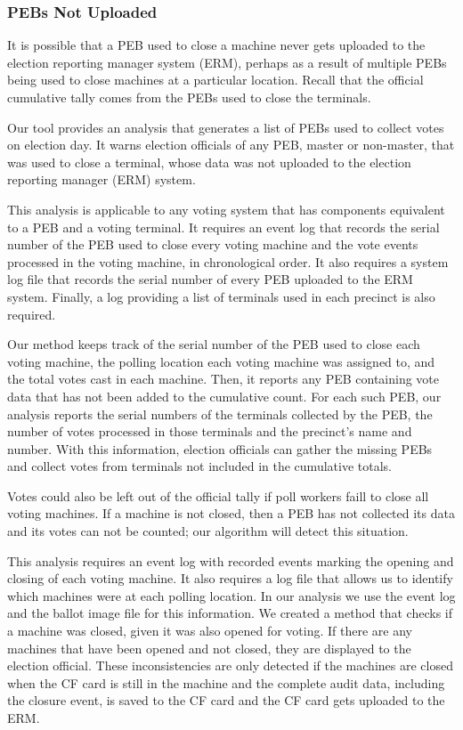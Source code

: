 \subsubsection{PEBs Not Uploaded}
\label{sec:pebs_not_uploaded}
It is possible that a PEB used to close a machine never gets uploaded to the
election reporting manager system (ERM), perhaps as a result of multiple PEBs
being used to close machines at a particular location. Recall that the official
cumulative tally comes from the PEBs used to close the terminals.

Our
tool provides an analysis that generates a list of PEBs used to collect
votes on election day. It warns election officials of any PEB, master
or non-master, that was used to close a terminal, whose data was not
uploaded to the election reporting manager (ERM) system.  

This analysis is applicable to any voting system that has components
equivalent to a PEB and a voting terminal.  It requires an event log
that records the serial number of the PEB used to close every voting
machine and the vote events processed in the voting machine, in
chronological order. It also requires a system log file that records the
serial number of every PEB uploaded to the ERM 
system. Finally, a log providing a list of terminals used in each
precinct is also required.

Our method keeps track of the serial number of the PEB used to close each voting
machine, the polling location each voting machine was assigned
to, and the total votes cast in each machine. Then, it
reports any PEB containing vote data that has not been added to the cumulative
count.  For each such PEB, our analysis reports the serial numbers of the
terminals collected by the PEB, the number of votes processed in those terminals
and the precinct's name and number. With this information, election officials
can gather the missing PEBs and collect votes from terminals not included in the
cumulative totals.

Votes could also be left out of the official tally if poll workers faill to close
all voting machines. If a machine is not closed, then a PEB has
not collected its data and its votes can not be counted; our algorithm
will  detect this situation.   

This analysis requires an event log with recorded events marking the
opening and closing of each voting machine. It also requires a log
file that allows us to identify which machines were at each polling
location. In our analysis we use the event log and the ballot image
file for this information. We created a method that checks if a
machine was closed, given it was also opened for voting.  
If there are any machines that have been opened and not
closed, they are displayed to the election official.  These
inconsistencies are only detected if the machines are closed when the
CF card is still in the machine and the complete audit data, including
the closure event, is saved to the CF card and the CF card gets uploaded to the
ERM.

